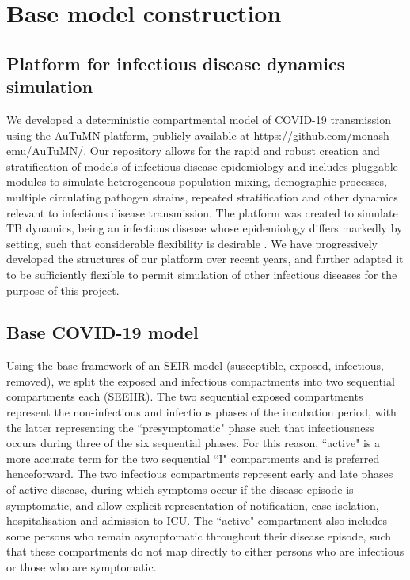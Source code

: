 \section{Base model construction}
\subsection{Platform for infectious disease dynamics simulation}

We developed a deterministic compartmental model of COVID-19 transmission using the AuTuMN platform,
publicly available at https://github.com/monash-emu/AuTuMN/.
Our repository allows for the rapid and robust creation and stratification of models of infectious disease epidemiology
and includes pluggable modules to simulate heterogeneous population mixing, demographic processes, multiple circulating
pathogen strains, repeated stratification and other dynamics relevant to infectious disease transmission.
The platform was created to simulate TB dynamics, being an infectious disease whose epidemiology differs markedly
by setting, such that considerable flexibility is desirable \cite{RN58}.
We have progressively developed the structures of our platform over recent years,
and further adapted it to be sufficiently flexible
to permit simulation of other infectious diseases for the purpose of this project.

\subsection{Base COVID-19 model}
Using the base framework of an SEIR model (susceptible, exposed, infectious, removed), we split the exposed and infectious compartments into two sequential compartments each (SEEIIR). The two sequential exposed compartments represent the non-infectious and infectious phases of the incubation period, with the latter representing the ``presymptomatic" phase such that infectiousness occurs during three of the six sequential phases. For this reason, ``active" is a more accurate term for the two sequential ``I" compartments and is preferred henceforward. The two infectious compartments represent early and late phases of active disease, during which symptoms occur if the disease episode is symptomatic, and allow explicit representation of notification, case isolation, hospitalisation and admission to ICU. The ``active" compartment also includes some persons who remain asymptomatic throughout their disease episode, such that these compartments do not map directly to either persons who are infectious or those who are symptomatic.



